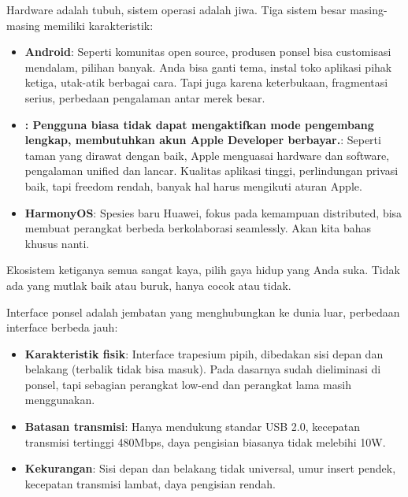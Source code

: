 
Hardware adalah tubuh, sistem operasi adalah jiwa. Tiga sistem besar masing-masing memiliki karakteristik:

\begin{itemize}
  \item \textbf{Android}: Seperti komunitas open source, produsen ponsel bisa customisasi mendalam, pilihan banyak. Anda bisa ganti tema, instal toko aplikasi pihak ketiga, utak-atik berbagai cara. Tapi juga karena keterbukaan, fragmentasi serius, perbedaan pengalaman antar merek besar.
  \item \textbf{: Pengguna biasa tidak dapat mengaktifkan mode pengembang lengkap, membutuhkan akun Apple Developer berbayar.}: Seperti taman yang dirawat dengan baik, Apple menguasai hardware dan software, pengalaman unified dan lancar. Kualitas aplikasi tinggi, perlindungan privasi baik, tapi freedom rendah, banyak hal harus mengikuti aturan Apple.
  \item \textbf{HarmonyOS}: Spesies baru Huawei, fokus pada kemampuan distributed, bisa membuat perangkat berbeda berkolaborasi seamlessly. Akan kita bahas khusus nanti.
\end{itemize}

Ekosistem ketiganya semua sangat kaya, pilih gaya hidup yang Anda suka. Tidak ada yang mutlak baik atau buruk, hanya cocok atau tidak.


Interface ponsel adalah jembatan yang menghubungkan ke dunia luar, perbedaan interface berbeda jauh:


\begin{itemize}
  \item \textbf{Karakteristik fisik}: Interface trapesium pipih, dibedakan sisi depan dan belakang (terbalik tidak bisa masuk). Pada dasarnya sudah dieliminasi di ponsel, tapi sebagian perangkat low-end dan perangkat lama masih menggunakan.
  \item \textbf{Batasan transmisi}: Hanya mendukung standar USB 2.0, kecepatan transmisi tertinggi 480Mbps, daya pengisian biasanya tidak melebihi 10W.
  \item \textbf{Kekurangan}: Sisi depan dan belakang tidak universal, umur insert pendek, kecepatan transmisi lambat, daya pengisian rendah.
\end{itemize}

